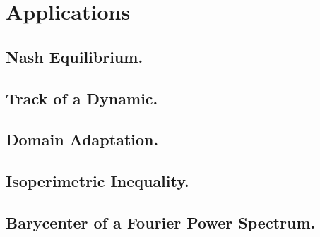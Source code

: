 \chapter{Applications}
\section{Nash Equilibrium.}
\section{Track of a Dynamic.}
\section{Domain Adaptation.}
\section{Isoperimetric Inequality.}
\section{Barycenter of a Fourier Power Spectrum.}

